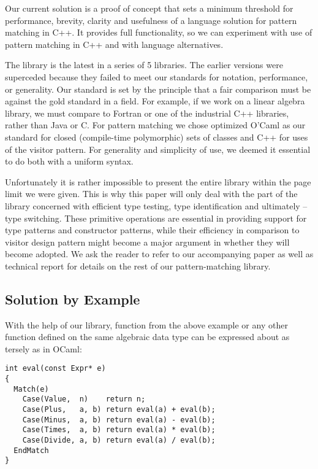 Our current solution is a proof of concept that sets a minimum threshold for 
performance, brevity, clarity and usefulness of a language solution for pattern 
matching in C++. It provides full functionality, so we can experiment with use 
of pattern matching in C++ and with language alternatives. 

The library is the latest in a series of 5 libraries. The earlier versions were 
superceded because they failed to meet our standards for notation, performance, 
or generality. Our standard is set by the principle that a fair comparison must 
be against the gold standard in a field. For example, if we work on a linear 
algebra library, we must compare to Fortran or one of the industrial C++ 
libraries, rather than Java or C. For pattern matching we chose optimized O'Caml 
as our standard for closed (compile-time polymorphic) sets of classes and C++ 
for uses of the visitor pattern. For generality and simplicity of use, we deemed 
it essential to do both with a uniform syntax.

Unfortunately it is rather impossible to present the entire library within the 
page limit we were given. This is why this paper will only deal with the part of 
the library concerned with efficient type testing, type identification and 
ultimately -- type switching. These primitive operations are essential in 
providing support for type patterns and constructor patterns, while their 
efficiency in comparison to visitor design pattern might become a major argument 
in whether they will become adopted. We ask the reader to refer to our 
accompanying paper\cite{AP} as well as technical report\cite{TR} for details on 
the rest of our pattern-matching library.

\subsection{Solution by Example}
\label{sec:sbe}

With the help of our library, function  from the above example or any 
other function defined on the same algebraic data type can be expressed about as 
tersely as in OCaml:

\begin{lstlisting}[keepspaces,columns=flexible]
int eval(const Expr* e)
{
  Match(e)
    Case(Value,  n)    return n;
    Case(Plus,   a, b) return eval(a) + eval(b);
    Case(Minus,  a, b) return eval(a) - eval(b);
    Case(Times,  a, b) return eval(a) * eval(b);
    Case(Divide, a, b) return eval(a) / eval(b);
  EndMatch
}
\end{lstlisting}

